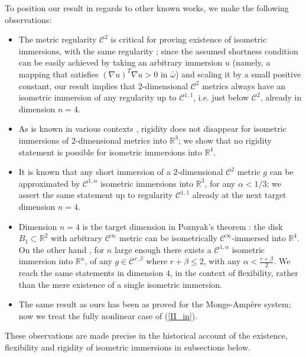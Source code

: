\documentclass[reqno,twoside,11pt]{amsart}
\newcommand{\R}{\mathbb{R}}
\numberwithin{equation}{section}
\theoremstyle{plain}
\theoremstyle{definition}
\begin{document}
To position our result in regards to other known works, we
make the following observations:
\begin{itemize}
\item[-] The metric regularity $\mathcal{C}^2$ is critical for proving
  existence of isometric immersions, with the same regularity \cite{Nash1, Jaco, Gro_book, Gun}; 
since the assumed shortness condition can be easily achieved by taking
an arbitrary immersion $u$ (namely, a mapping that satisfies $(\nabla
u)^T\nabla u > 0$ in $\bar\omega$) and scaling it by a small positive constant, our result
implies that $2$-dimensional $\mathcal{C}^2$ metrics
always have an isometric immersion of any regularity up to
$\mathcal{C}^{1,1}$, i.e. just below
$\mathcal{C}^2$, already in dimension $n=4$. 
\item[-] As is known in various contexts \cite{CV, Her, HarNir, Pogo2, Bor5, CDS}, rigidity
does not disappear for isometric immersions of $2$-dimensional metrics
into $\R^3$; we show that no rigidity statement is possible for isometric immersions into $\R^4$.  
\item[-] It is known \cite{CHI2} that any short immersion of a $2$-dimensional
$\mathcal{C}^2$ metric $g$ can be approximated by $\mathcal{C}^{1,\alpha}$ isometric
immersions into $\R^3$, for any $\alpha<1/3$; we assert the same statement up
to regularity $\mathcal{C}^{1,1}$ already at the next target
dimension $n=4$. 
\item[-] Dimension $n=4$ is the target dimension in
Poznyak's theorem \cite{Poz}: the disk $B_1\subset\R^2$ with arbitrary
$\mathcal{C}^\infty$ metric can be isometrically
$\mathcal{C}^\infty$-immersed into $\R^4$. 
On the other hand \cite{Kallen}, for $n$ large enough there
exists a $\mathcal{C}^{1,\alpha}$ isometric immersion into $\R^n$, of any
$g\in\mathcal{C}^{r,\beta}$ where $r+\beta\leq 2$, with any
$\alpha<\frac{r+\beta}{2}$. We reach the same statements in 
dimension $4$, in the context of flexibility, rather than the mere
existence of a single isometric immersion. 
\item[-] The same result as ours has been as proved
\cite{in_lew2} for the Monge-Amp\`ere system; now we treat the fully nonlinear
case of (\ref{II_in}).
\end{itemize}
These observations are made precise in the historical
account of the existence, flexibility and rigidity of isometric
immersions in subsections below.

\medskip
\end{document}
